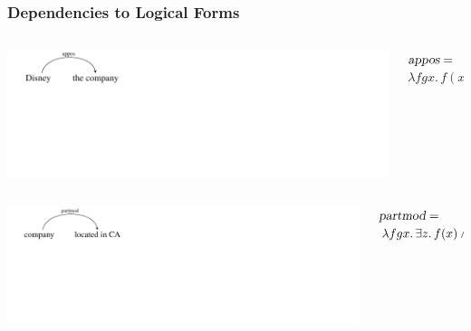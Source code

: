\documentclass[mathserif,12pt]{beamer}
\renewcommand{\land}{\wedge}
\newcommand{\lspace}{.\,}
\begin{document}
\begin{frame}
\frametitle{Dependencies to Logical Forms}
 \vspace{0.6cm}
\begin{columns}
  \begin{column}{0.40\textwidth}
   \centering
  \vspace{-1em}
\includegraphics[trim=2em 9em 28em 0em,clip=true,scale=1.3]{figures/appos}   
  \end{column}
  \begin{column}{0.58\textwidth}
    \large $\textsl{appos}  =$ \\ \hspace{0.5em} $ \lambda f g x \lspace f(x) \land g(x)$ \\
  \end{column}
 \end{columns}
 
 \vspace{0.6cm}
 \begin{columns}
  \begin{column}{0.39\textwidth}
   \centering
\includegraphics[trim=1.9em 9em 26em 0em,clip=true,scale=1.2]{figures/partmod}   
  \end{column}
  \begin{column}{0.60\textwidth}
\large    $\textsl{partmod}= $ \\ \hspace{0.5em} $\lambda f g x \lspace \exists z \lspace f(x) \land g(z) \land \hbox{arg}_2(z_e, x_a)$ 
  \end{column}
 \end{columns}
 

\end{frame}
\end{document}
